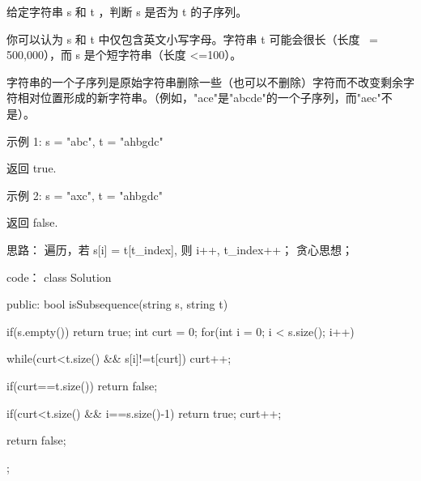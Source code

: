 给定字符串 s 和 t ，判断 s 是否为 t 的子序列。

你可以认为 s 和 t 中仅包含英文小写字母。字符串 t 可能会很长（长度 ~= 500,000），而 s 是个短字符串（长度 <=100）。

字符串的一个子序列是原始字符串删除一些（也可以不删除）字符而不改变剩余字符相对位置形成的新字符串。（例如，"ace"是"abcde"的一个子序列，而"aec"不是）。

示例 1:
s = "abc", t = "ahbgdc"

返回 true.

示例 2:
s = "axc", t = "ahbgdc"

返回 false.
























思路：
遍历，若 s[i] = t[t_index], 则 i++, t_index++；
贪心思想；






















code：
class Solution {
public:
    bool isSubsequence(string s, string t) {
        if(s.empty()) return true;
        int curt = 0;
        for(int i = 0; i < s.size(); i++)
        {
            while(curt<t.size() && s[i]!=t[curt]) curt++;
            
            if(curt==t.size()) return false;
            
            if(curt<t.size() && i==s.size()-1) return true;
            curt++;
        }
        return false;
    }
};